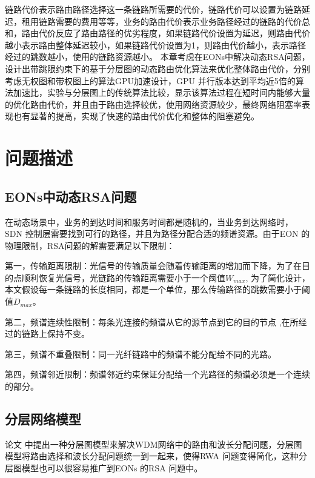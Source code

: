 链路代价表示路由路径选择这一条链路所需要的代价，链路代价可以设置为链路延迟，租用链路需要的费用等等，业务的路由代价表示业务路径经过的链路的代价总和，路由代价反应了路由路径的优劣程度，如果链路代价设置为延迟，则路由代价越小表示路由整体延迟较小，如果链路代价设置为1，则路由代价越小，表示路径经过的跳数越小，使用的链路资源越小。
本章考虑在EONs中解决动态RSA问题，设计出带跳限约束下的基于分层图的动态路由优化算法来优化整体路由代价，分别考虑无权图和带权图上的算法GPU加速设计，GPU 并行版本达到平均近5倍的算法加速比，实验与分层图上的传统算法比较，显示该算法过程在短时间内能够大量的优化路由代价，并且由于路由选择较优，使用网络资源较少，最终网络阻塞率表现也有显著的提高，实现了快速的路由代价优化和整体的阻塞避免。
\section{问题描述}
\subsection{EONs中动态RSA问题}
在动态场景中，业务的到达时间和服务时间都是随机的，当业务到达网络时，SDN 控制层需要找到可行的路径，并且为路径分配合适的频谱资源。由于EON 的物理限制，RSA问题的解需要满足以下限制：

第一，传输距离限制：光信号的传输质量会随着传输距离的增加而下降，为了在目的点顺利恢复光信号，光链路的传输距离需要小于一个阈值$W_{max}$, 为了简化设计，本文假设每一条链路的长度相同，都是一个单位，那么传输路径的跳数需要小于阈值$D_{max}$。

第二，频谱连续性限制：每条光连接的频谱从它的源节点到它的目的节点 ,在所经过的链路上保持不变。

第三，频谱不重叠限制：同一光纤链路中的频谱不能分配给不同的光路。

第四，频谱邻近限制：频谱邻近约束保证分配给一个光路径的频谱必须是一个连续的部分。
\subsection{分层网络模型}
论文 中提出一种分层图模型来解决WDM网络中的路由和波长分配问题，分层图模型将路由选择和波长分配问题统一到一起来，使得RWA 问题变得简化，这种分层图模型也可以很容易推广到EONs 的RSA 问题中。

